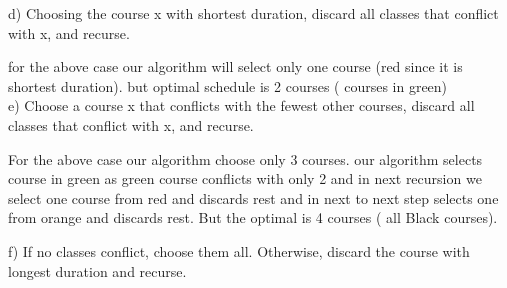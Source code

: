\documentclass{extarticle}
\theoremstyle{remark}
\begin{document}
d) Choosing the course x with shortest duration, discard all classes that
conflict with x, and recurse.
\newline
\newline
\begin{center}

    
\end{center}
\vspace{0.2in}
for the above case our algorithm will select only one course (red since it is shortest duration). but optimal schedule is 2 courses ( courses in green)\\

e) Choose a course x that conflicts with the fewest other courses, discard all classes that conflict with x, and recurse.\newline
\newline
\begin{center}

\end{center}
\vspace{0.2in}

For the above case our algorithm choose only 3 courses. our algorithm selects course in green as green course conflicts with only 2 and in next recursion we select one course from red and discards rest and in next to next step selects one from orange and discards rest.
\newline
But the optimal is 4 courses ( all Black courses).

f) If no classes conflict, choose them all. Otherwise, discard the course
with longest duration and recurse.
\newline
\newline
\begin{center}

    
\end{center}
\end{document}
